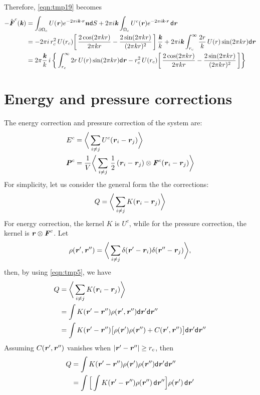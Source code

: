 \documentclass[aps,pre,preprint,unsortedaddress]{revtex4}
\renewcommand{\v}[1]{\textbf{\textit{#1}}}
\renewcommand{\d}[1]{\textsf{#1}}
\begin{document}
Therefore, \eqref{eqn:tmp19} becomes
\begin{align}\nonumber
  -\hat{\v F}^c(\v k) 
  & =
  \int_{\partial\Omega_c}U(\v r) e^{-2\pi i\v k\cdot\v r} \v n\d dS
  + 2\pi i \v k\int_{\Omega_c} U^c(\v r) e^{-2\pi i\v k\cdot\v r}\,\d d\v r\\ \nonumber
  & = 
  -2\pi i\, r_c^2\,U(r_c)
  \bigg[\,
  \frac{2\cos(2\pi kr)}{2\pi kr}
  -\frac{2\sin(2\pi kr)}{(2\pi kr)^2}
  \,\bigg] \,\frac{\v k}k +
  2\pi i \v k
  \int_{r_c}^\infty \frac{2r}k\,U(r)\sin(2\pi kr)\d d\v r \\
  & =
  2\pi\frac{\v k}k\, i\,
  \bigg\{
  \int_{r_c}^\infty 2r\,U(r)\sin(2\pi kr)\d d\v r
  - r_c^2\,U(r_c)
  \bigg[\,
  \frac{2\cos(2\pi kr)}{2\pi kr}
  -\frac{2\sin(2\pi kr)}{(2\pi kr)^2}
  \,\bigg] 
  \bigg\}
\end{align}



\section{Energy and pressure corrections}
The energy correction and pressure correction of the system are:
\begin{align}
  E^c &= \bigg\langle \sum_{i\neq j} U^c(\v r_i - \v r_j) \bigg\rangle\\
  \v P^c &= \frac1{V} \bigg\langle \sum_{i\neq j}\,\frac12\, (\v r_i - \v r_j) \otimes \v F^c(\v r_i - \v r_j) \bigg\rangle
\end{align}
For simplicity, let us consider the general form the the corrections:
\begin{align}
  Q = \bigg\langle \sum_{i\neq j} K(\v r_i - \v r_j) \bigg\rangle
\end{align}
For energy correction, the kernel $K$ is $U^c$, while for the pressure
correction, the kernel is $\v r\otimes\v F^c$.
Let
\begin{align}
  \rho(\v r', \v r'') =
  \bigg\langle
  \sum_{i\neq j}\delta(\v r' - \v r_i)\delta(\v r'' - \v r_j)
  \bigg\rangle,
\end{align}
then, by using \eqref{eqn:tmp5}, we have 
\begin{align}\nonumber
  Q
  &= \bigg\langle \sum_{i\neq j} K(\v r_i - \v r_j) \bigg\rangle\\\nonumber
  & = \int K(\v r' - \v r'') \rho(\v r', \v r'') \d d\v r'\d d\v r'' \\\nonumber
  & = \int K(\v r' - \v r'')
  \big[
  \rho(\v r') \rho(\v r'') + C(\v r', \v r'')
  \big]
  \d d\v r'\d d\v r''
\end{align}
Assuming $C(\v r', \v r'')$ vanishes when $\vert\v r' - \v r''\vert \geq r_c$, then
\begin{align} \nonumber
  Q 
  & = \int K(\v r' - \v r'')
  \rho(\v r') \rho(\v r'') 
  \d d\v r'\d d\v r'' \\
  & = \int
  \Big[
  \int K(\v r' - \v r'') \rho(\v r'')\,\d d\v r''
  \Big]
  \rho(\v r')\,\d d\v r'
\end{align}
\end{document}
